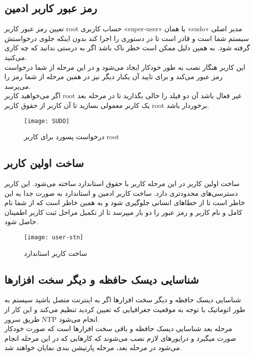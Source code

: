 \subsection{رمز عبور کاربر ادمین }
\begin{frame}{تعیین رمز عبور کاربر root}
  حساب کاربری «super-user» یا همان «sudo» مدیر اصلی سیستم شما است و قادر است تا در دستوری را اجرا کند بدون اینکه جلوی درخواستش گرفته شود. به همین دلیل ممکن است خطر ناک باشد اگر به درستی ندانید که چه کاری می‌کنید.\\
  این کاربر هنگار نصب به طور خودکار ایجاد می‌شود و در این مرحله از شما درخواست رمز عبور می‌کند و برای تایید آن یکبار دیگر نیز در همین مرحله از شما رمز را می‌پرسد.\\
  اگر می‌خواهید کاربر root غیر فعال باشد آن دو فیلد را خالی بگذارید تا در مرحله بعد یک کاربر معمولی بسازید تا آن کاربر از حقوق کاربر root برخوردار باشد.
  \begin{figure}
    \texttt{[image: SUDO]}
    \caption{درخواست پسورد برای کاربر root~\cite{fig:deb_user_root}}
  \end{figure}
\end{frame}
\subsection{ساخت اولین کاربر}
\begin{frame}{ساخت اولین کاربر}
  در این مرحله کاربر با حقوق استاندارد ساخته می‌شود. این کاربر دسترسی‌های محدودتری دارد. ساخت کاربر ادمین و استاندارد به صورت جدا به این خاطر است تا از خطاهای انسانی جلوگیری شود و به همین خاطر است که از شما نام کامل و نام کاربر و رمز عبور را دو بار میپرسد تا از تکمیل مراحل ثبت کاربر اطمینان حاصل شود.
  \begin{figure}
    \texttt{[image: user-stn]}
    \caption{ساخت کاربر استاندارد~\cite{fig:deb_user_stn}}
  \end{figure}
\end{frame}
\subsection{شناسایی دیسک حافظه و دیگر سخت افزارها}
\begin{frame}{شناسایی دیسک حافظه و دیگر سخت افزارها}
  اگر به اینترنت متصل باشید سیستم به طور اتوماتیک با توجه به موقعیت جغرافیایی که تعیین کردید تنظیم می‌کند و این کار از طریق سرور NTP انجام می‌شود.\\
  مرحله بعد شناسایی دیسک حافظه و باقی سخت افزارها است که صورت خودکار صورت میگیرد و درایورهای لازم نصب می‌شوند که کارهایی که در این مرحله انجام می‌شود در مرحله بعد، مرحله پارتیشن بندی نمایان خواهند شد.
\end{frame}
